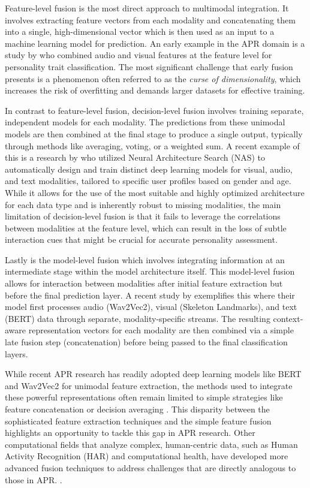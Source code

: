 Feature-level fusion is the most direct approach to multimodal integration. It involves extracting feature vectors from each modality and concatenating them into a single, high-dimensional vector which is then used as an input to a machine learning model for prediction. An early example in the APR domain is a study by \cite{Sidorov2014} who combined audio and visual features at the feature level for personality trait classification. The most significant challenge that early fusion presents is a  phenomenon often referred to as the \textit{curse of dimensionality}, which increases the risk of overfitting and demands larger datasets for effective training. 

In contrast to feature-level fusion, decision-level fusion involves training separate, independent models for each modality. The predictions from these unimodal models are then combined at the final stage to produce a single output, typically through methods like averaging, voting, or a weighted sum. A recent example of this is a research by \cite{salam22a} who utilized Neural Architecture Search (NAS) to automatically design and train distinct deep learning models for visual, audio, and text modalities, tailored to specific user profiles based on gender and age. While it allows for the use of the most suitable and highly optimized architecture for each data type and is inherently robust to missing modalities, the main limitation of  decision-level fusion is that it fails to leverage the correlations between modalities at the feature level, which can result in the loss of subtle interaction cues that might be crucial for accurate personality assessment.

Lastly is the model-level fusion which involves integrating information at an intermediate stage within the model architecture itself. This model-level fusion allows for interaction between modalities after initial feature extraction but before the final prediction layer. A recent study by \cite{Bhin2025} exemplifies this where their model first processes audio (Wav2Vec2), visual (Skeleton Landmarks), and text (BERT) data through separate, modality-specific streams. The resulting context-aware representation vectors for each modality are then combined via a simple late fusion step (concatenation) before being passed to the final classification layers. 

While recent APR research has readily adopted deep learning models like BERT and Wav2Vec2 for unimodal feature extraction, the methods used to integrate these powerful representations often remain limited to simple strategies like feature concatenation or decision averaging \citep{Bhin2025, Zhao2022}. This disparity between the sophisticated feature extraction techniques and the simple feature fusion highlights an opportunity to tackle this gap in APR research. Other computational fields that analyze complex, human-centric data, such as Human Activity Recognition (HAR) and computational health, have developed more advanced fusion techniques to address challenges that are directly analogous to those in APR. \citep{Ehatisham-Ul-Haq_Javed_Azam_Malik_Irtaza_Lee_Mahmood_2019, Cai_Qu_Li_Zhang_Hu_Hu_2020}.

